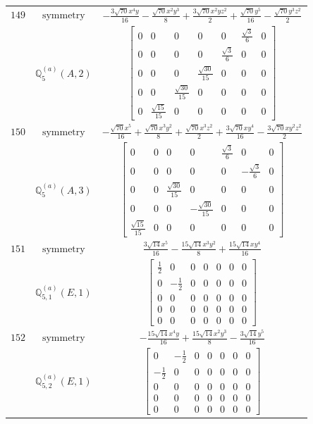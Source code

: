 \documentclass[fleqn,8pt,landscape]{jsarticle}
\begin{document}
\begin{longtable}{ccc}
$ 149 $ & $ \text{symmetry} $ & $ - \frac{3 \sqrt{70} x^{4} y}{16} - \frac{\sqrt{70} x^{2} y^{3}}{8} + \frac{3 \sqrt{70} x^{2} y z^{2}}{2} + \frac{\sqrt{70} y^{5}}{16} - \frac{\sqrt{70} y^{3} z^{2}}{2} $ \\
$  $ & $ \mathbb{Q}_{5}^{(a)}(A,2) $ & $ \begin{bmatrix} 0 & 0 & 0 & 0 & 0 & \frac{\sqrt{3}}{6} & 0 \\ 0 & 0 & 0 & 0 & \frac{\sqrt{3}}{6} & 0 & 0 \\ 0 & 0 & 0 & \frac{\sqrt{30}}{15} & 0 & 0 & 0 \\ 0 & 0 & \frac{\sqrt{30}}{15} & 0 & 0 & 0 & 0 \\ 0 & \frac{\sqrt{15}}{15} & 0 & 0 & 0 & 0 & 0 \end{bmatrix} $ \\ \hline
$ 150 $ & $ \text{symmetry} $ & $ - \frac{\sqrt{70} x^{5}}{16} + \frac{\sqrt{70} x^{3} y^{2}}{8} + \frac{\sqrt{70} x^{3} z^{2}}{2} + \frac{3 \sqrt{70} x y^{4}}{16} - \frac{3 \sqrt{70} x y^{2} z^{2}}{2} $ \\
$  $ & $ \mathbb{Q}_{5}^{(a)}(A,3) $ & $ \begin{bmatrix} 0 & 0 & 0 & 0 & \frac{\sqrt{3}}{6} & 0 & 0 \\ 0 & 0 & 0 & 0 & 0 & - \frac{\sqrt{3}}{6} & 0 \\ 0 & 0 & \frac{\sqrt{30}}{15} & 0 & 0 & 0 & 0 \\ 0 & 0 & 0 & - \frac{\sqrt{30}}{15} & 0 & 0 & 0 \\ \frac{\sqrt{15}}{15} & 0 & 0 & 0 & 0 & 0 & 0 \end{bmatrix} $ \\ \hline
$ 151 $ & $ \text{symmetry} $ & $ \frac{3 \sqrt{14} x^{5}}{16} - \frac{15 \sqrt{14} x^{3} y^{2}}{8} + \frac{15 \sqrt{14} x y^{4}}{16} $ \\
$  $ & $ \mathbb{Q}_{5,1}^{(a)}(E,1) $ & $ \begin{bmatrix} \frac{1}{2} & 0 & 0 & 0 & 0 & 0 & 0 \\ 0 & - \frac{1}{2} & 0 & 0 & 0 & 0 & 0 \\ 0 & 0 & 0 & 0 & 0 & 0 & 0 \\ 0 & 0 & 0 & 0 & 0 & 0 & 0 \\ 0 & 0 & 0 & 0 & 0 & 0 & 0 \end{bmatrix} $ \\ \hline
$ 152 $ & $ \text{symmetry} $ & $ - \frac{15 \sqrt{14} x^{4} y}{16} + \frac{15 \sqrt{14} x^{2} y^{3}}{8} - \frac{3 \sqrt{14} y^{5}}{16} $ \\
$  $ & $ \mathbb{Q}_{5,2}^{(a)}(E,1) $ & $ \begin{bmatrix} 0 & - \frac{1}{2} & 0 & 0 & 0 & 0 & 0 \\ - \frac{1}{2} & 0 & 0 & 0 & 0 & 0 & 0 \\ 0 & 0 & 0 & 0 & 0 & 0 & 0 \\ 0 & 0 & 0 & 0 & 0 & 0 & 0 \\ 0 & 0 & 0 & 0 & 0 & 0 & 0 \end{bmatrix} $ \\ \hline

\end{longtable}
\end{document}
